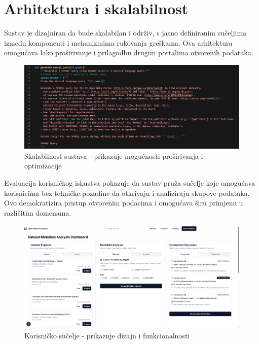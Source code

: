 \section{Arhitektura i skalabilnost}

Sustav je dizajniran da bude skalabilan i održiv, s jasno definiranim sučeljima između komponenti i mehanizmima rukovanja greškama. Ova arhitektura omogućava lako proširivanje i prilagodbu drugim portalima otvorenih podataka.

\begin{figure}[htbp]
    \centering
    \includegraphics[width=1\textwidth]{figures/izvjestaj_image_13.png}
    \caption{Skalabilnost sustava - prikazuje mogućnosti proširivanja i optimizacije}
    \label{fig:system_scalability}
\end{figure}

Evaluacija korisničkog iskustva pokazuje da sustav pruža sučelje koje omogućava korisnicima bez tehničke pozadine da otkrivaju i analiziraju skupove podataka. Ovo demokratizira pristup otvorenim podacima i omogućava širu primjenu u različitim domenama.

\begin{figure}[htbp]
    \centering
    \includegraphics[width=1\textwidth]{figures/izvjestaj_image_4.png}
    \caption{Korisničko sučelje - prikazuje dizajn i funkcionalnosti}
    \label{fig:user_interface}
\end{figure}

